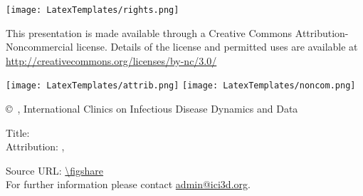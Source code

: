 {\topBar%

\begin{frame}

\begin{centering}

\vspace{6ex}\texttt{[image: LatexTemplates/rights.png]}

\vfill

{
	\tiny\linespread{12}
	This presentation is made available through a Creative Commons Attribution-Noncommercial license.
	Details of the license and permitted uses are available at \url{http://creativecommons.org/licenses/by-nc/3.0/} \par
}

\smallskip
\texttt{[image: LatexTemplates/attrib.png]}
\hspace{3em}
\texttt{[image: LatexTemplates/noncom.png]}

{\tiny\copyright\ \years, International Clinics on Infectious Disease Dynamics and Data}

\vfill

{\footnotesize
	Title: \inserttitle \\
	Attribution: \insertauthor, \insertdate 
	\par
}

\bigskip

{
	\scriptsize Source URL: \url{\figshare} \\
	For further information please contact \url{admin@ici3d.org}.
	\par
}

\vfill

\end{centering}

\end{frame}

}
